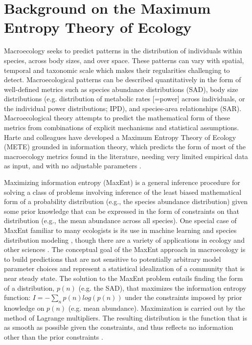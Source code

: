 \newpage


\section{Background on the Maximum Entropy Theory of Ecology}
Macroecology \citep{Brown:1995ui} seeks to predict patterns in the
distribution of individuals within species, across body sizes, and
over space. These patterns can vary with spatial, temporal and
taxonomic scale which makes their regularities challenging to detect.
Macroecological patterns can be described quantitatively in the form
of well-defined metrics such as species abundance distributions (SAD),
body size distributions (e.g. distribution of metabolic rates [=power]
across individuals, or the individual power distributions; IPD), and
species-area relationships (SAR). Macroecological theory attempts to
predict the mathematical form of these metrics from combinations of
explicit mechanisms and statistical assumptions. Harte and colleagues
have developed a Maximum Entropy Theory of Ecology (METE) grounded in
information theory, which predicts the form of most of the
macroecology metrics found in the literature, needing very limited
empirical data as input, and with no adjustable parameters
\citep{Harte:2008uf, Harte:2009it, Harte:2011ut}.

Maximizing information entropy (MaxEnt) is a general inference
procedure for solving a class of problems involving inference of the
least biased mathematical form of a probability distribution (e.g.,
the species abundance distribution) given some prior knowledge that
can be expressed in the form of constraints on that distribution
(e.g., the mean abundance across all species). One special case of
MaxEnt familiar to many ecologists is its use in machine learning and
species distribution modeling \citep[SDM;][]{Phillips:2006vf}, though
there are a variety of applications in ecology \citep{Shipley:2006ui,
  Williams:2010uk} and other sciences \citep[e.g.][]{Skilling:1988tj,
  Jaynes:2003ua, Banavar:2010tz}. The conceptual goal of the MaxEnt
approach in macroecology is to build predictions that are not
sensitive to potentially arbitrary model parameter choices and
represent a statistical idealization of a community that is near
steady state. The solution to the MaxEnt problem entails finding the
form of a distribution, $p(n)$ (e.g. the SAD), that maximizes the
information entropy function: $I = - \sum_{n} p(n) log(p(n))$ under
the constraints imposed by prior knowledge on $p(n)$ (e.g. mean
abundance). Maximization is carried out by the method of Lagrange
multipliers. The resulting distribution is the function that is as
smooth as possible given the constraints, and thus reflects no
information other than the prior constraints \citep{Jaynes:1957to,
  Jaynes:1982eg}.
  
